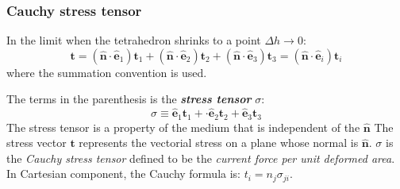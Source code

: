 \documentclass[notes]{beamer}
\begin{document}
\begin{frame}
\frametitle{Cauchy stress tensor}
In the limit when the tetrahedron shrinks to a point $\Delta h \to 0$:
	\begin{equation*}
	\mathbf{t} = 
(\mathbf{\hat{n}}\cdot\mathbf{\hat{e}}_1) \mathbf{t}_1 +
(\mathbf{\hat{n}}\cdot\mathbf{\hat{e}}_2) \mathbf{t}_2 + 
(\mathbf{\hat{n}}\cdot\mathbf{\hat{e}}_3) \mathbf{t}_3 = (\mathbf{\hat{n}}\cdot\mathbf{\hat{e}}_i) \mathbf{t}_i
\end{equation*}
where the summation convention is used.

The terms in the parenthesis is the 
\textit{\textbf{stress tensor}} $\sigma$:
\begin{equation*}
	\sigma \equiv \mathbf{\hat{e}}_1 \mathbf{t}_1 +
\cdot\mathbf{\hat{e}}_2 \mathbf{t}_2 + 
\mathbf{\hat{e}}_3 \mathbf{t}_3
\end{equation*}
The stress tensor is a property of the medium that is independent of the $\mathbf{\hat{n}}$
The stress vector $\mathbf{t}$ represents the vectorial stress on a plane whose normal is $\mathbf{\hat{n}}$. $\sigma$ is the \textit{Cauchy stress tensor} defined to be the \textit{current force per unit deformed area}. In Cartesian component, the Cauchy formula is: $t_i = n_j \sigma_{ji}$.
\end{frame}
\end{document}
